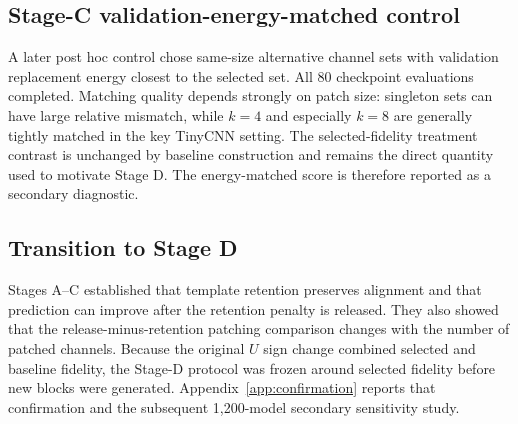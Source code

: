 \subsection{Stage-C validation-energy-matched control}\label{app:stage-c-energy}

A later post hoc control chose same-size alternative channel sets with validation replacement energy closest to the selected set. All 80 checkpoint evaluations completed. Matching quality depends strongly on patch size: singleton sets can have large relative mismatch, while $k=4$ and especially $k=8$ are generally tightly matched in the key TinyCNN setting. The selected-fidelity treatment contrast is unchanged by baseline construction and remains the direct quantity used to motivate Stage D. The energy-matched score is therefore reported as a secondary diagnostic.

\subsection{Transition to Stage D}\label{app:transition}

Stages A--C established that template retention preserves alignment and that prediction can improve after the retention penalty is released. They also showed that the release-minus-retention patching comparison changes with the number of patched channels. Because the original $U$ sign change combined selected and baseline fidelity, the Stage-D protocol was frozen around selected fidelity before new blocks were generated. Appendix~\ref{app:confirmation} reports that confirmation and the subsequent 1,200-model secondary sensitivity study.
